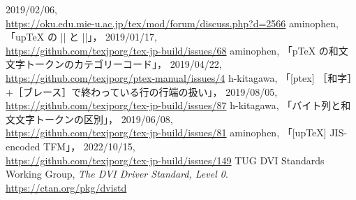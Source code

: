 \documentclass[a4paper,11pt,nomag,dvipdfmx]{jsarticle}
\begin{document}
\begin{thebibliography}{99}
  2019/02/06,\\
  \url{https://oku.edu.mie-u.ac.jp/tex/mod/forum/discuss.php?d=2566}
  aminophen, 「upTeX の |\if| と |\ifcat|」，
  2019/01/17,\\
  \url{https://github.com/texjporg/tex-jp-build/issues/68}
  aminophen, 「pTeX の和文文字トークンのカテゴリーコード」，
  2019/04/22,\\
  \url{https://github.com/texjporg/ptex-manual/issues/4}
  h-kitagawa, 「[ptex] ［和字］+［ブレース］で終わっている行の行端の扱い」，
  2019/08/05,\\
  \url{https://github.com/texjporg/tex-jp-build/issues/87}
  h-kitagawa, 「バイト列と和文文字トークンの区別」，
  2019/06/08,\\
  \url{https://github.com/texjporg/tex-jp-build/issues/81}
  aminophen, 「[upTeX] JIS-encoded TFM」，
  2022/10/15,\\
  \url{https://github.com/texjporg/tex-jp-build/issues/149}
  TUG DVI Standards Working Group,
  \textit{The DVI Driver Standard, Level 0}.\\
  \url{https://ctan.org/pkg/dvistd}
\end{thebibliography}

\newpage
\printindex
\end{document}
